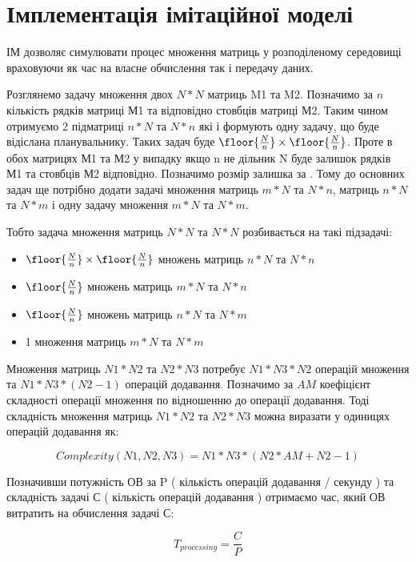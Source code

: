 
\section{Імплементація імітаційної моделі}

ІМ дозволяє симулювати процес множення матриць у розподіленому середовищі враховуючи як час на власне обчислення так і передачу даних.

Розглянемо задачу множення двох $N*N$ матриць M1 та M2. Позначимо за $n$ кількість рядків матриці М1 та відповідно стовбців матриці М2. Таким чином отримуємо 2 підматриці $n*N$ та $N*n$ які і формують одну задачу, що буде відіслана планувальнику. Таких задач буде $ \floor{ \frac{N}{n} } \times \floor{ \frac{N}{n} } $. Проте в обох матрицях М1 та М2 у випадку якщо n не дільник N буде залишок рядків М1 та стовбців М2 відповідно. Позначимо розмір залишка за  . Тому до основних задач ще потрібно додати задачі множення матриць $m*N$ та $N*n$, матриць $n*N$ та $N*m$ і одну задачу множення  $m*N$ та $N*m$.

Тобто задача множення матриць $N*N$ та $N*N$ розбивається на такі підзадачі:
\begin{itemize}
	\item $ \floor{ \frac{N}{n} } \times \floor{ \frac{N}{n} } $ множень матриць $n*N$ та $N*n$ 
	\item $ \floor{ \frac{N}{n} } $ множень матриць $m*N$ та $N*n$ 
	\item $ \floor{ \frac{N}{n} } $ множень матриць $n*N$ та $N*m$ 
	\item 1 множення матриць $m*N$ та $N*m$ 
\end{itemize}

Множення матриць $N1*N2$ та $N2*N3$ потребує $N1*N3*N2$ операцій множення та $N1*N3*(N2-1)$ операцій додавання. Позначимо за $AM$ коефіцієнт складності операції множення по відношенню до операції додавання. Тоді складність множення матриць $N1*N2$ та $N2*N3$ можна виразати у одиницях операцій додавання як:

\begin{equation}
\label{eq:complexity_fmla}
Complexity(N1,N2,N3) = N1*N3*( N2 *AM + N2 - 1)
\end{equation}

Позначивши потужність ОВ за P ( кількість операцій додавання / секунду ) та складність задачі С ( кількість операцій додавання ) отримаємо час, який ОВ витратить на обчислення задачі С:

\begin{equation}
\label{eq:processing_time_simple}
T_{processing} = \frac{C}{P}
\end{equation}

